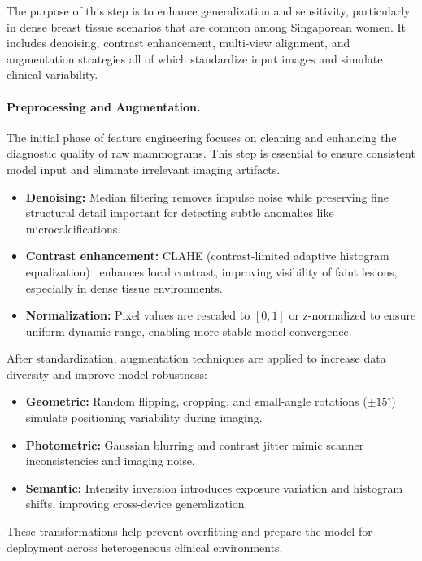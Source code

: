 \documentclass[12pt]{article}
\begin{document}
The purpose of this step is to enhance generalization and sensitivity, particularly in dense breast tissue scenarios that are common among Singaporean women. It includes denoising, contrast enhancement, multi-view alignment, and augmentation strategies all of which standardize input images and simulate clinical variability. 

\paragraph{Preprocessing and Augmentation.}
The initial phase of feature engineering focuses on cleaning and enhancing the diagnostic quality of raw mammograms. This step is essential to ensure consistent model input and eliminate irrelevant imaging artifacts.

\begin{itemize}
    \item \textbf{Denoising:} Median filtering removes impulse noise while preserving fine structural detail important for detecting subtle anomalies like microcalcifications.
    \item \textbf{Contrast enhancement:} CLAHE (contrast-limited adaptive histogram equalization)~\cite{14} enhances local contrast, improving visibility of faint lesions, especially in dense tissue environments.
    \item \textbf{Normalization:} Pixel values are rescaled to $[0,1]$ or z-normalized to ensure uniform dynamic range, enabling more stable model convergence.
\end{itemize}

After standardization, augmentation techniques are applied to increase data diversity and improve model robustness:

\begin{itemize}
    \item \textbf{Geometric:} Random flipping, cropping, and small-angle rotations ($\pm15^{\circ}$) simulate positioning variability during imaging.
    \item \textbf{Photometric:} Gaussian blurring and contrast jitter mimic scanner inconsistencies and imaging noise.
    \item \textbf{Semantic:} Intensity inversion introduces exposure variation and histogram shifts, improving cross-device generalization.
\end{itemize}

These transformations help prevent overfitting and prepare the model for deployment across heterogeneous clinical environments.
\end{document}
